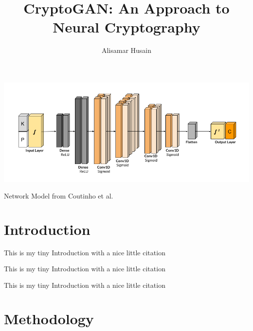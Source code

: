 \documentclass[sigconf]{acmart}
\begin{document}
  \title{CryptoGAN: An Approach to Neural Cryptography}

  \author{Alisamar Husain}

  \begin{abstract}
    \lipsum[1]
  \end{abstract}
  
  \begin{teaserfigure}
    \includegraphics[width=\textwidth]{ref/netmodel}
    \caption{Network Model from Coutinho et al.}
    \label{fig:teaser}
  \end{teaserfigure}

  \maketitle
 
  \section{Introduction}
  This is my tiny Introduction with a nice 
  little citation \cite{visualloss}

  This is my tiny Introduction with a nice 
  little citation \cite{seminalanc}
  
  
  This is my tiny Introduction with a nice 
  little citation \cite{perfanc}

  \section{Methodology} 
  \lipsum
  
  
  
\end{document}
